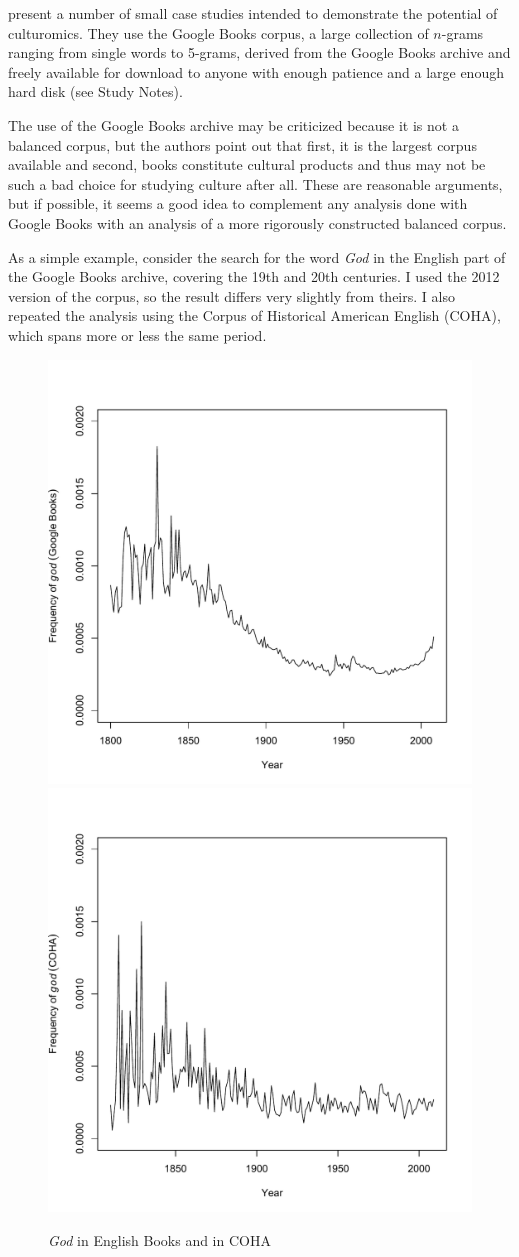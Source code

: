 \citet{michel_quantitative_2011} present a number of small case studies intended to demonstrate the potential of culturomics.  They use the Google Books corpus, a large collection of $n$\hyp{}grams  ranging from single words to 5\hyp{}grams, derived from the Google Books archive and freely available for download to anyone with enough patience and a large enough hard disk (see Study Notes).

The use of the Google Books archive may be criticized because it is not a balanced corpus, but the authors point out that first, it is the largest  corpus available and second, books constitute cultural  products and thus may not be such a bad choice for studying culture after all. These are reasonable arguments, but if possible, it seems a good idea to complement any analysis done with Google Books with an analysis of a more rigorously constructed balanced corpus.

As a simple example, consider the search for the word \textit{God} in the English part of the Google Books archive, covering the 19th and 20th centuries. I used the 2012 version of the corpus, so the result differs very slightly from theirs. I also repeated the analysis using the Corpus of Historical American English (COHA),  which spans more or less the same period.

\begin{figure}
\caption{\textit{God} in English Books and in COHA\label{fig:demiseofgod}}
\includegraphics[width=.5\linewidth,trim=0 0 0 50]{figures/demiseofgodgoogle}%
\includegraphics[width=.5\linewidth,trim=0 0 0 50]{figures/demiseofgodcoha}%
\end{figure}

